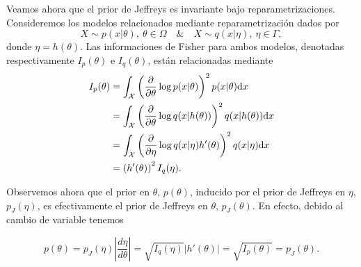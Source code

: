 Veamos ahora que el prior de Jeffreys es invariante bajo reparametrizaciones. Consideremos los modelos relacionados mediante reparametrización dados por 
\begin{equation}
	X\sim p(x|\theta),\ \theta\in\Omega\quad \& \quad X\sim q(x|\eta),\ \eta\in\Gamma,
\end{equation}
donde $\eta = h(\theta)$. Las informaciones de Fisher para ambos modelos, denotadas respectivamente $I_p(\theta)$ e $I_q(\theta)$, están relacionadas mediante
\begin{align}
	I_p(\theta) &= \int_{\mathcal X}\left(\frac{\partial}{\partial\theta}\log p(x|\theta)\right)^2p(x|\theta){\text{d}} x\nonumber\\
				&= \int_{\mathcal X}\left(\frac{\partial}{\partial\theta}\log q(x|h(\theta))\right)^2q(x|h(\theta)){\text{d}} x\nonumber\\
				&= \int_{\mathcal X}\left(\frac{\partial}{\partial\eta}\log q(x|\eta) h'(\theta)\right)^2q(x|\eta){\text{d}} x\nonumber\\
				&= \left(h'(\theta)\right)^2 I_q(\eta).
\end{align} 

Observemos ahora que el prior en $\theta$, $p(\theta)$, inducido por el prior de Jeffreys en $\eta$, $p_J(\eta)$, es efectivamente el prior de Jeffreys en $\theta$, $p_J(\theta)$. En efecto, debido al cambio de variable tenemos

\begin{equation}
	p(\theta) = p_J(\eta) \left|\frac{d \eta}{d \theta}\right| = \sqrt{I_q(\eta)}\left|h'(\theta)\right| = \sqrt{I_p(\theta)} = p_J(\theta).
\end{equation}

   
